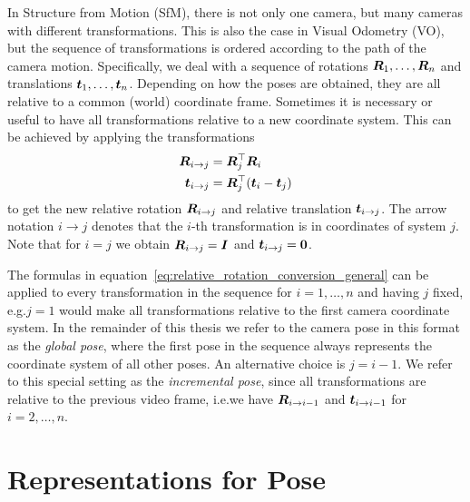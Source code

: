 		In Structure from Motion (SfM), there is not only one camera, but many cameras with different transformations.
		This is also the case in Visual Odometry (VO), but the sequence of transformations is ordered according to the path of the camera motion. 
		Specifically, we deal with a sequence of rotations $\bm{R}_1, \dots, \bm{R}_n$ and translations $\bm{t}_1, \dots, \bm{t}_n$. 
		Depending on how the poses are obtained, they are all relative to a common (world) coordinate frame.
		Sometimes it is necessary or useful to have all transformations relative to a new coordinate system.
		This can be achieved by applying the transformations
		\begin{align}\label{eq:relative_rotation_conversion_general}
			\begin{split}
				\bm{R}_{i \rightarrow j} 		&= \bm{R}_{j}^{\top} \bm{R}_{i} \\
				\bm{t}_{i \rightarrow j} 	&= \bm{R}_{j}^{\top} (\bm{t}_i - \bm{t}_j)
			\end{split}
		\end{align}
		to get the new relative rotation 
		$\bm{R}_{i \rightarrow j}$ and relative translation $\bm{t}_{i \rightarrow j}$.
		The arrow notation $i \rightarrow j$ denotes that the $i$-th transformation is in coordinates of system $j$.
		Note that for $i = j$ we obtain 
		$\bm{R}_{i \rightarrow j} = \bm{I}$ 
		and 
		$\bm{t}_{i \rightarrow j} = \bm{0}$.
		
		The formulas in equation~\ref{eq:relative_rotation_conversion_general} can be applied to every transformation in the sequence for $i = 1, \dots, n$ and having $j$ fixed, e.g.\@ $j = 1$ would make all transformations relative to the first camera coordinate system.
		In the remainder of this thesis we refer to the camera pose in this format as the \emph{global pose}, where the first pose in the sequence always represents the coordinate system of all other poses.
		An alternative choice is $j = i - 1$.
		We refer to this special setting as the \emph{incremental pose}, since all transformations are relative to the previous video frame, i.e.\@ we have 
		$\bm{R}_{i \rightarrow i - 1}$ and $\bm{t}_{i \rightarrow i - 1}$
		for $i = 2, \dots, n$.
		
	\section{Representations for Pose}
		
